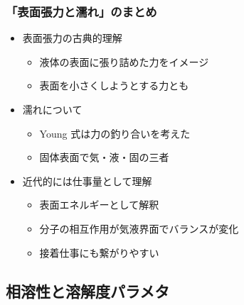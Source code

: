 \documentclass[12pt, dvipdfmx]{beamer}
\begin{document}
\begin{frame}
	\frametitle{「表面張力と濡れ」のまとめ}
        \begin{boxnote}
            \vspace{-3mm}
            \begin{itemize}
                \item 表面張力の古典的理解
                    \begin{itemize}
                        \item 液体の表面に張り詰めた力をイメージ
						\item 表面を小さくしようとする力とも
                    \end{itemize} 
                \item 濡れについて
                    \begin{itemize}
                        \item Young 式は力の釣り合いを考えた
                        \item 固体表面で気・液・固の三者
                    \end{itemize} 
                \item 近代的には仕事量として理解
                    \begin{itemize}
                        \item 表面エネルギーとして解釈
                        \item 分子の相互作用が気液界面でバランスが変化
                        \item 接着仕事にも繋がりやすい
                    \end{itemize}
            \end{itemize}
        \end{boxnote}
\end{frame}

\subsection{相溶性と溶解度パラメタ}
\end{document}
